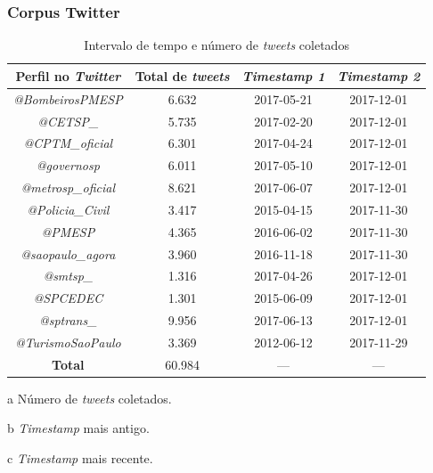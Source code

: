 \documentclass{beamer}
\begin{document}
\begin{frame}
\frametitle{Corpus Twitter}
\begin{table}[!htb]
\centering
\caption{Intervalo de tempo e número de \textit{tweets} coletados}
	\label{tab:tweetsCollected}
\begin{adjustbox}{max height=28mm}
\begin{threeparttable}
\begin{tabular}{c|c|c|c}
\toprule
\textbf {Perfil no \textit{Twitter}} &\textbf{Total de \textit{tweets}\tnote{a}}  &\textbf{ \textit{Timestamp 1\tnote{b}}} & \textbf{\textit{Timestamp 2\tnote{c}}} \\ 
\midrule
\textit{@BombeirosPMESP} & 6.632 & 2017-05-21 & 2017-12-01 \\
\hline
\textit{@CETSP\_} & 5.735 & 2017-02-20  & 2017-12-01 \\
\hline
\textit{@CPTM\_oficial} & 6.301 & 2017-04-24 & 2017-12-01 \\
\hline
\textit{@governosp}  & 6.011 & 2017-05-10 & 2017-12-01 \\
\hline
\textit{@metrosp\_oficial} & 8.621 & 2017-06-07 & 2017-12-01 \\
\hline
\textit{@Policia\_Civil}  & 3.417 & 2015-04-15 & 2017-11-30 \\
\hline
\textit{@PMESP}  & 4.365 & 2016-06-02 & 2017-11-30 \\
\hline
\textit{@saopaulo\_agora}  & 3.960 & 2016-11-18 & 2017-11-30 \\
\hline
\textit{@smtsp\_} & 1.316 & 2017-04-26 & 2017-12-01 \\
\hline
\textit{@SPCEDEC} & 1.301 & 2015-06-09 & 2017-12-01 \\
\hline
\textit{@sptrans\_} & 9.956 & 2017-06-13 & 2017-12-01 \\
\hline
\textit{@TurismoSaoPaulo} & 3.369 & 2012-06-12 & 2017-11-29 \\
\midrule
\midrule
\textbf{Total} & 60.984 & --- & --- \\
\bottomrule
\end{tabular}
\begin{tablenotes}
            \item[a] Número de \textit{tweets} coletados.
            \item[b] \textit{Timestamp} mais antigo.
            \item[c] \textit{Timestamp} mais recente.
        \end{tablenotes}
\end{threeparttable}
\end{adjustbox}
\end{table}
\end{frame}
\end{document}
